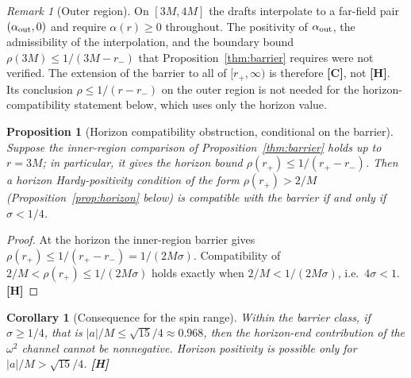 \documentclass[11pt,a4paper]{article}
\newcommand{\VH}{\textcolor{vh}{\textbf{[H]}}}
\newcommand{\CC}{\textcolor{cc}{\textbf{[C]}}}
\newtheorem{proposition}[theorem]{Proposition}
\newtheorem{corollary}[theorem]{Corollary}
\theoremstyle{remark}
\newtheorem{remark}[theorem]{Remark}
\theoremstyle{definition}
\begin{document}
\begin{remark}[Outer region]
On $[3M, 4M]$ the drafts interpolate to a far-field pair $(\alpha_{\rm out}, 0)$ and require $\alpha(r)\ge 0$ throughout. The positivity of $\alpha_{\rm out}$, the admissibility of the interpolation, and the boundary bound $\rho(3M) \le 1/(3M-r_-)$ that Proposition~\ref{thm:barrier} requires were not verified. The extension of the barrier to all of $[r_+,\infty)$ is therefore \CC, not \VH. Its conclusion $\rho \le 1/(r-r_-)$ on the outer region is not needed for the horizon-compatibility statement below, which uses only the horizon value.
\end{remark}

\begin{proposition}[Horizon compatibility obstruction, conditional on the barrier]
\label{prop:compat}
Suppose the inner-region comparison of Proposition~\ref{thm:barrier} holds up to $r=3M$; in particular, it gives the horizon bound $\rho(r_+)\le1/(r_+-r_-)$. Then a horizon Hardy-positivity condition of the form $\rho(r_+) > 2/M$ (Proposition~\ref{prop:horizon} below) is compatible with the barrier if and only if $\sigma < 1/4$.
\end{proposition}

\begin{proof}
At the horizon the inner-region barrier gives $\rho(r_+) \le 1/(r_+-r_-) = 1/(2M\sigma)$. Compatibility of $2/M < \rho(r_+) \le 1/(2M\sigma)$ holds exactly when $2/M < 1/(2M\sigma)$, i.e.\ $4\sigma < 1$. \VH
\end{proof}

\begin{corollary}[Consequence for the spin range]
Within the barrier class, if $\sigma \ge 1/4$, that is $|a|/M \le \sqrt{15}/4 \approx 0.968$, then the horizon-end contribution of the $\omega^2$ channel cannot be nonnegative. Horizon positivity is possible only for $|a|/M > \sqrt{15}/4$. \VH
\end{corollary}
\end{document}
